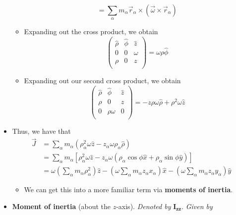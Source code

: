 \documentclass[../notes.tex]{subfiles}
\begin{document}
\begin{itemize}
\begin{itemize}
\begin{equation*}
            = \sum_\alpha m_\alpha\vec{r}_\alpha\times(\vec{\omega}\times\vec{r}_\alpha)
        \end{equation*}
        \item Expanding out the cross product, we obtain
        \begin{equation*}
            \begin{pmatrix}
                \hat{\rho} & \hat{\phi} & \hat{z}\\
                0 & 0 & \omega\\
                \rho & 0 & z\\
            \end{pmatrix}
            = \omega\rho\hat{\phi}
        \end{equation*}
        \item Expanding out our second cross product, we obtain
        \begin{equation*}
            \begin{pmatrix}
                \hat{\rho} & \hat{\phi} & \hat{z}\\
                \rho & 0 & z\\
                0 & \rho\omega & 0\\
            \end{pmatrix}
            = -z\rho\omega\hat{\rho}+\rho^2\omega\hat{z}
        \end{equation*}
    \end{itemize}
    \item Thus, we have that
    \begin{align*}
        \vec{J} &= \sum_\alpha m_\alpha(\rho_\alpha^2\omega\hat{z}-z_\alpha\omega\rho_\alpha\hat{\rho})\\
        &= \sum_\alpha m_\alpha[\rho_\alpha^2\omega\hat{z}-z_\alpha\omega(\rho_\alpha\cos\phi\hat{x}+\rho_\alpha\sin\phi\hat{y})]\\
        &= \omega\left( \sum_\alpha m_\alpha\rho_\alpha^2 \right)\hat{z}-\left( \omega\sum_\alpha m_\alpha z_\alpha x_\alpha \right)\hat{x}-\left( \omega\sum_\alpha m_\alpha z_\alpha y_\alpha \right)\hat{y}
    \end{align*}
    \begin{itemize}
        \item We can get this into a more familiar term via \textbf{moments of inertia}.
    \end{itemize}
    \item \textbf{Moment of inertia} (about the $z$-axis). \emph{Denoted by} $\bm{I_{zz}}$. \emph{Given by}

\end{itemize}
\end{document}
